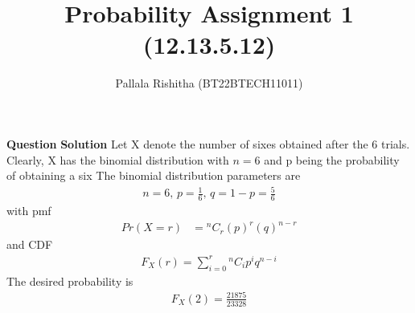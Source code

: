 \documentclass[12pt,twocolumn,notitlepage]{article}
\title{Probability Assignment 1 (12.13.5.12)}
\author{Pallala Rishitha (BT22BTECH11011)}
\date{}
\providecommand{\brak}[1]{\ensuremath{\left(#1\right)}}
\newcommand*{\comb}[2]{{}^{#1}C_{#2}}
\begin{document}
\maketitle
\textbf{Question}
\textbf{Solution}
Let X denote the number of sixes obtained after the 6 trials. Clearly, X has the binomial distribution with $n=6$ and p being the probability of obtaining a six
\fi
The binomial distribution parameters are
\begin{align}
	n = 6,\,
    p = \frac{1}{6} ,\,
    q =1-p = \frac{5}{6}     
\end{align}
with pmf
\begin{align}
 Pr\brak{X=r} &= \comb{n}{r}\brak{p}^{r}\brak{q}^{n-r} 
\end{align}
and CDF
\begin{align}
    F_X(r)=\sum_{i=0}^r\comb{n}{i}p^iq^{n-i}
\end{align}
The desired probability is 
\begin{align}
  F_X\brak{2}   = \frac{21875}{23328} 
\end{align}
\end{document}
